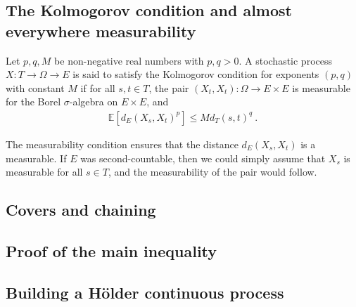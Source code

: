 \documentclass[lean]{Draft}
\begin{document}

\subsection{The Kolmogorov condition and almost everywhere measurability}

\begin{definition}
Let $p, q, M$ be non-negative real numbers with $p,q>0$.
A stochastic process $X : T \to \Omega \to E$ is said to satisfy the Kolmogorov condition for exponents $(p, q)$ with constant $M$ if for all $s, t \in T$, the pair $(X_t, X_t) : \Omega \to E \times E$ is measurable for the Borel $\sigma$-algebra on $E \times E$, and
\begin{align*}
  \mathbb{E}[d_E(X_s, X_t)^p] \le M d_T(s, t)^q
  \: .
\end{align*}
\end{definition}

The measurability condition ensures that the distance $d_E(X_s, X_t)$ is a measurable.
If $E$ was second-countable, then we could simply assume that $X_s$ is measurable for all $s \in T$, and the measurability of the pair would follow.






\subsection{Covers and chaining}



\subsection{Proof of the main inequality}



\subsection{Building a Hölder continuous process}
\end{document}
